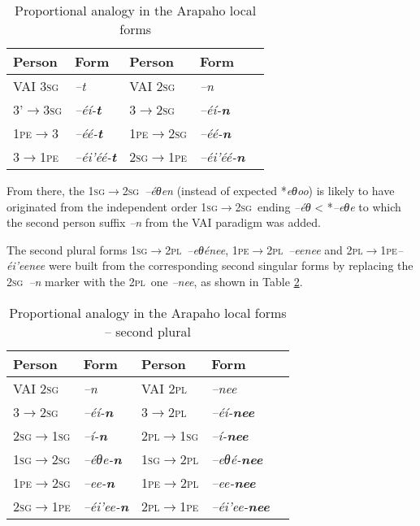 \documentclass[twoside,a4paper,11pt]{article}
\newcommand{\ipa}[1]{{\phon\textit{#1}}}
\newcommand{\sg}{\textsc{sg}}
\newcommand{\pl}{\textsc{pl}}
\newcommand{\grise}[1]{\cellcolor{lightgray}\textbf{#1}}
\newcommand{\Σ}{\greek{Σ}}
\newcommand{\pe}{\textsc{pe}}
\begin{document}
\begin{table}[H]
\caption{Proportional analogy in the Arapaho local forms}
\centering \label{tab:arapaho.analogy.local}
\begin{tabular}{lllll}
\toprule
 Person &  Form &  Person &  Form\\
\midrule 
 VAI 3\sg & \ipa{--t} &  VAI 2\sg & \ipa{--n} \\
  3'$\rightarrow$3\sg & \ipa{--éí-\textbf{t}} &   3$\rightarrow$2\sg & \ipa{--éí-\textbf{n}} \\
  \midrule 
    1\pe$\rightarrow$3 & \ipa{--éé-\textbf{t}} & 1\pe$\rightarrow$2\sg &  \grise{}\ipa{--éé-\textbf{n}} \\
  3$\rightarrow$1\pe & \ipa{--éi'éé-\textbf{t}} & 2\sg$\rightarrow$1\pe &  \grise{}\ipa{--éi'éé-\textbf{n}} \\
\bottomrule
\end{tabular}
\end{table}

From there, the 1\sg$\rightarrow$2\sg\  \ipa{--éθen} (instead of expected *\ipa{eθoo}) is likely to have originated from the independent order 1\sg$\rightarrow$2\sg\ ending \ipa{--éθ} < *\ipa{--eθe} to which the second person suffix \ipa{--n} from the VAI paradigm was added. 

The second plural forms 1\sg$\rightarrow$2\pl\ \ipa{--eθénee}, 1\pe$\rightarrow$2\pl\ \ipa{--eenee}  and 2\pl$\rightarrow$1\pe \ipa{--éi'eenee} were built from the corresponding second singular forms by replacing the 2\sg\  \ipa{--n} marker with the 2\pl\ one \ipa{--nee}, as shown in Table \ref{tab:arapaho.analogy.local2}.
 
 
 \begin{table}[H]
\caption{Proportional analogy in the Arapaho local forms -- second plural}
\centering \label{tab:arapaho.analogy.local2}
\begin{tabular}{lllll}
\toprule
 Person &  Form &  Person &  Form\\
\midrule 
 VAI 2\sg & \ipa{--n} &  VAI 2\pl & \ipa{--nee} \\
  3$\rightarrow$2\sg & \ipa{--éí-\textbf{n}} &   3$\rightarrow$2\pl & \ipa{--éí-\textbf{nee}} \\
2\sg$\rightarrow$1\sg &  \ipa{--í-\textbf{n}} & 2\pl$\rightarrow$1\sg &  \ipa{--í-\textbf{nee}} \\
   \midrule 
    1\sg$\rightarrow$2\sg& \ipa{--éθe-\textbf{n}} & 1\sg$\rightarrow$2\pl &\ipa{--eθé-\textbf{nee}} \grise{} \\
    1\pe$\rightarrow$2\sg&\ipa{--ee-\textbf{n}} & 1\pe$\rightarrow$2\pl &\ipa{--ee-\textbf{nee}}\grise{} \\
    2\sg$\rightarrow$1\pe& \ipa{--éi'ee-\textbf{n}} & 2\pl$\rightarrow$1\pe & \ipa{--éi'ee-\textbf{nee}}\grise{}\\
\bottomrule
\end{tabular}
\end{table}
 
\end{document}
